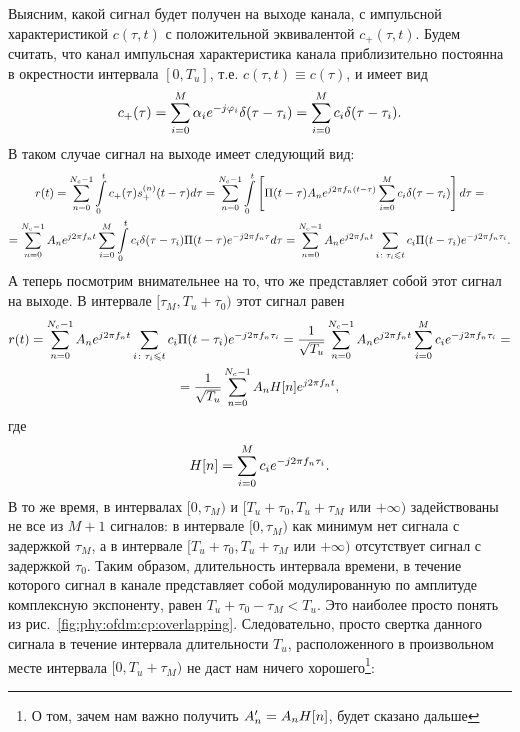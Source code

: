 \documentclass{book}
\numberwithin{theorem}{chapter}
\numberwithin{statement}{chapter}
\numberwithin{lemma}{chapter}
\theoremstyle{definition}
\numberwithin{task}{chapter}
\theoremstyle{remark}
\numberwithin{example}{chapter}
\theoremstyle{definition}
\numberwithin{definition}{chapter}
\theoremstyle{remark}
\theoremstyle{remark}
\numberwithin{lyrics}{section}
\begin{document}
Выясним, какой сигнал будет получен на выходе канала, с импульсной характеристикой $c(\tau, t)$ с положительной эквивалентой $c_{+}(\tau, t)$.  Будем считать, что канал импульсная характеристика канала приблизительно постоянна в окрестности интервала $[0, T_u]$, т.е. $c(\tau, t) \equiv c(\tau)$, и имеет вид
\begin{equation}
\notag
c_{+}(\tau) = \sum\limits_{i = 0}^{M} \alpha_i e^{-j \varphi_i} \delta(\tau - \tau_i) = \sum\limits_{i = 0}^{M} c_i \delta(\tau - \tau_i).
\end{equation}
В таком случае сигнал на выходе имеет следующий вид:
\begin{equation}
\begin{gathered}
r(t) = \sum\limits_{n = 0}^{N_c - 1} \int\limits_{0}^{t} c_{+}(\tau) s^{(n)}_{+}(t - \tau) d\tau
= \sum\limits_{n = 0}^{N_c - 1} \int\limits_{0}^{t} \left[\Pi(t - \tau) A_n e^{j2\pi f_n (t - \tau)} \sum\limits_{i = 0}^M c_i \delta(\tau - \tau_i) \right] d\tau = \\
= \sum\limits_{n = 0}^{N_c - 1} A_n e^{j2\pi f_n t} \sum\limits_{i = 0}^M \int\limits_{0}^{t} c_i \delta(\tau - \tau_i) \Pi(t - \tau)e^{-j 2\pi f_n \tau} d\tau = \sum\limits_{n = 0}^{N_c - 1} A_n e^{j 2\pi f_n t} \sum\limits_{i\colon \tau_i \leqslant t} c_i \Pi(t - \tau_i) e^{-j 2 \pi f_n \tau_i}.
\end{gathered}
\end{equation}
А теперь посмотрим внимательнее на то, что же представляет собой этот сигнал на выходе. В интервале $[\tau_M, T_u + \tau_0)$ этот сигнал равен
\begin{gather*}
r(t) = \sum\limits_{n = 0}^{N_c - 1} A_n e^{j 2\pi f_n t} \sum\limits_{i\colon \tau_i \leqslant t} c_i \Pi(t - \tau_i) e^{-j 2 \pi f_n \tau_i} = \frac{1}{\sqrt{T_u}}\sum\limits_{n = 0}^{N_c - 1} A_n e^{j 2\pi f_n t} \sum\limits_{i = 0}^M c_i e^{-j 2 \pi f_n \tau_i} = \\ = \frac{1}{\sqrt{T_u}}\sum\limits_{n = 0}^{N_c - 1} A_n H[n] e^{j 2\pi f_n t},
\end{gather*}
где
\begin{equation}
H[n] = \sum\limits_{i = 0}^M c_i e^{-j 2 \pi f_n \tau_i}.
\end{equation}
В то же время, в интервалах $[0, \tau_M)$ и $[T_u + \tau_0, T_u + \tau_M \text{ или $+\infty$})$ задействованы не все из $M+1$ сигналов: в интервале 
$[0, \tau_M)$ как минимум нет сигнала с задержкой $\tau_M$, а в интервале $[T_u + \tau_0, T_u + \tau_M \text{ или $+\infty$})$ отсутствует сигнал с задержкой $\tau_0$. Таким образом, длительность интервала времени, в течение которого сигнал в канале представляет собой модулированную по амплитуде комплексную экспоненту, равен $T_u + \tau_0 - \tau_M < T_u$. Это наиболее просто понять из рис.~\ref{fig:phy:ofdm:cp:overlapping}. Следовательно, просто свертка данного сигнала в течение интервала длительности $T_u$, расположенного в произвольном месте интервала $[0, T_u + \tau_M)$ не даст нам ничего хорошего\footnote{О том, зачем нам важно получить $A_n' = A_n H[n]$, будет сказано дальше}:
\end{document}
